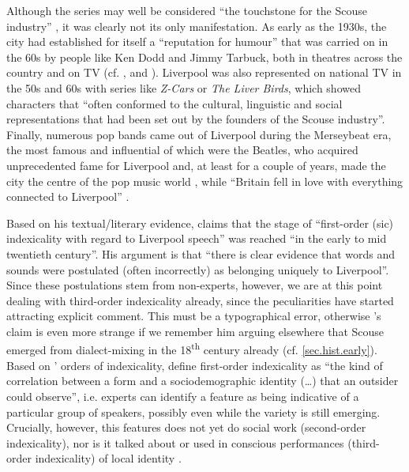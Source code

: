 Although the series may well be considered ``the touchstone for the Scouse industry'' \citep[79]{crowley2012}, it was clearly not its only manifestation.
As early as the 1930s, the city had established for itself a ``reputation for humour'' that was carried on in the 60s by people like Ken Dodd and Jimmy Tarbuck, both in theatres across the country and on TV (cf. \citealt[423]{murden2006}, and \citealp[49]{belchem2006a}).
Liverpool was also represented on national TV in the 50s and 60s with series like \emph{Z-Cars} or \emph{The Liver Birds}, which showed characters that ``often conformed to the cultural, linguistic and social representations that had been set out by the founders of the Scouse industry''.
Finally, numerous pop bands came out of Liverpool during the Merseybeat era, the most famous and influential of which were the Beatles, who acquired unprecedented fame for Liverpool and, at least for a couple of years, made the city the centre of the pop music world \citep[cf.][75]{crowley2012}, while ``Britain fell in love with everything connected to Liverpool'' \citep[423]{murden2006}.

Based on his textual/literary evidence, \citet[107]{crowley2012} claims that the stage of ``first-order (sic) indexicality with regard to Liverpool speech'' was reached ``in the early to mid twentieth century''.
His argument is that ``there is clear evidence that words and sounds were postulated (often incorrectly) as belonging uniquely to Liverpool''.
Since these postulations stem from non-experts, however, we are at this point dealing with third-order indexicality already, since the peculiarities have started attracting explicit comment.
This must be a typographical error, otherwise \citeauthor{crowley2012}'s claim is even more strange if we remember him arguing elsewhere that Scouse emerged from dialect-mixing in the 18\textsuperscript{th} century already (cf. \ref{sec.hist.early}).
Based on \citeauthor{silverstein2003}' \citeyear{silverstein2003} orders of indexicality, \textcite[81]{johnstoneetal2006} define first-order indexicality as ``the kind of correlation between a form and a sociodemographic identity (\ldots) that an outsider could observe'', i.e. experts can identify a feature as being indicative of a particular group of speakers, possibly even while the variety is still emerging.
Crucially, however, this features does not yet do social work (second-order indexicality), nor is it talked about or used in conscious performances (third-order indexicality) of local identity \parencite[cf.][83--84]{johnstoneetal2006}.

